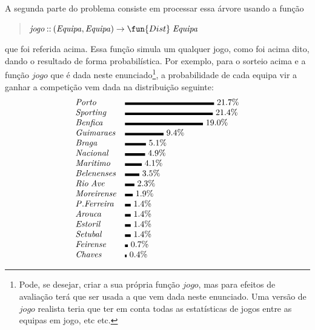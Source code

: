 \documentclass[a4paper]{article}
\newcommand{\Conid}[1]{\mathit{#1}}
\newcommand{\Varid}[1]{\mathit{#1}}
\begin{document}
A segunda parte do problema consiste em processar essa árvore usando a função
\begin{quote}
\ensuremath{\Varid{jogo}\mathbin{::}(\Conid{Equipa},\Conid{Equipa})\to \fun{Dist}\;\Conid{Equipa}}
\end{quote}
que foi referida acima. Essa função simula um qualquer jogo, como foi acima
dito, dando o resultado de forma probabilística. Por exemplo, para o sorteio
acima e a função \ensuremath{\Varid{jogo}} que é dada neste enunciado\footnote{Pode, se desejar,
criar a sua própria função \ensuremath{\Varid{jogo}}, mas para efeitos de avaliação terá que ser
usada a que vem dada neste enunciado. Uma versão de \ensuremath{\Varid{jogo}} realista teria que ter
em conta todas as estatísticas de jogos entre as equipas em jogo, etc etc.},
a probabilidade de cada equipa vir a ganhar a competição vem dada na distribuição
seguinte:
\[
\begin{array}{ll}
\ensuremath{\Conid{Porto}} & \rule{36.89mm}{3pt}\ 21.7\%\\
\ensuremath{\Conid{Sporting}} & \rule{36.379999999999995mm}{3pt}\ 21.4\%\\
\ensuremath{\Conid{Benfica}} & \rule{32.3mm}{3pt}\ 19.0\%\\
\ensuremath{\Conid{Guimaraes}} & \rule{15.98mm}{3pt}\ 9.4\%\\
\ensuremath{\Conid{Braga}} & \rule{8.67mm}{3pt}\ 5.1\%\\
\ensuremath{\Conid{Nacional}} & \rule{8.33mm}{3pt}\ 4.9\%\\
\ensuremath{\Conid{Maritimo}} & \rule{6.969999999999999mm}{3pt}\ 4.1\%\\
\ensuremath{\Conid{Belenenses}} & \rule{5.95mm}{3pt}\ 3.5\%\\
\ensuremath{\Conid{Rio}\;\Conid{Ave}} & \rule{3.9099999999999997mm}{3pt}\ 2.3\%\\
\ensuremath{\Conid{Moreirense}} & \rule{3.23mm}{3pt}\ 1.9\%\\
\ensuremath{\Conid{\Conid{P}.Ferreira}} & \rule{2.38mm}{3pt}\ 1.4\%\\
\ensuremath{\Conid{Arouca}} & \rule{2.38mm}{3pt}\ 1.4\%\\
\ensuremath{\Conid{Estoril}} & \rule{2.38mm}{3pt}\ 1.4\%\\
\ensuremath{\Conid{Setubal}} & \rule{2.38mm}{3pt}\ 1.4\%\\
\ensuremath{\Conid{Feirense}} & \rule{1.19mm}{3pt}\ 0.7\%\\
\ensuremath{\Conid{Chaves}} & \rule{0.68mm}{3pt}\ 0.4\%\\
\end{array}
\]
\end{document}
